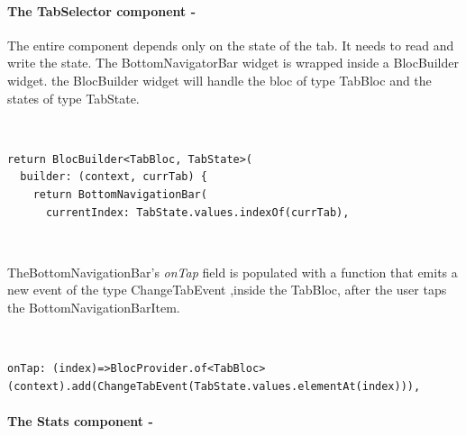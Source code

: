 \paragraph{The TabSelector component - }
\label{subpar:todo_app_bloc_core_state}

The entire component depends only on the state of the tab. It needs to read and write the state. The BottomNavigatorBar widget is wrapped inside a BlocBuilder widget. the BlocBuilder widget will handle the bloc of type TabBloc and the states of type TabState.
\begin{code}
\mbox{}\\
 \mbox{}
\label{code:2.14}
\begin{verbatim}
return BlocBuilder<TabBloc, TabState>(
  builder: (context, currTab) {
    return BottomNavigationBar(
      currentIndex: TabState.values.indexOf(currTab),
\end{verbatim}
\mbox{}\\
\end{code}
TheBottomNavigationBar’s \textit{onTap} field is populated with a function that emits a new event of the type ChangeTabEvent ,inside the TabBloc, after the user taps the BottomNavigationBarItem.
\begin{code}
\mbox{}\\
 \mbox{}
\label{code:2.14}
\begin{verbatim}
onTap: (index)=>BlocProvider.of<TabBloc>(context).add(ChangeTabEvent(TabState.values.elementAt(index))),
\end{verbatim}
\mbox{}
\end{code}


\paragraph{The Stats component - }
\label{subpar:todo_app_bloc_core_state}

